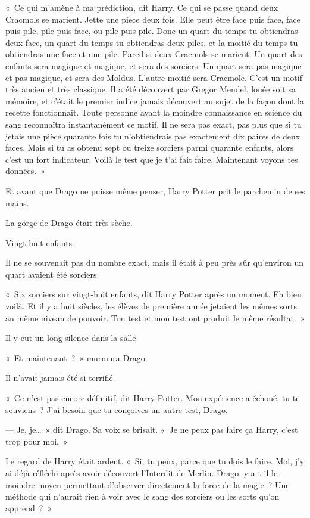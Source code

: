 «~Ce qui m'amène à ma prédiction, dit Harry.
Ce qui se passe quand deux Cracmols se marient.
Jette une pièce deux fois.
Elle peut être face puis face, face puis pile, pile puis face, ou pile puis pile.
Donc un quart du temps tu obtiendras deux face, un quart du temps tu obtiendras deux piles, et la moitié du temps tu obtiendras une face et une pile.
Pareil si deux Cracmols se marient.
Un quart des enfants sera magique et magique, et sera des sorciers.
Un quart sera pas-magique et pas-magique, et sera des Moldus.
L'autre moitié sera Cracmole.
C'est un motif très ancien et très classique.
Il a été découvert par Gregor Mendel, louée soit sa mémoire, et c'était le premier indice jamais découvert au sujet de la façon dont la recette fonctionnait.
Toute personne ayant la moindre connaissance en science du sang reconnaîtra instantanément ce motif.
Il ne sera pas exact, pas plus que si tu jetais une pièce quarante fois tu n'obtiendrais pas exactement dix paires de deux faces.
Mais si tu as obtenu sept ou treize sorciers parmi quarante enfants, alors c'est un fort indicateur.
Voilà le test que je t'ai fait faire.
Maintenant voyons tes données.~»

Et avant que Drago ne puisse même penser, Harry Potter prit le parchemin de ses mains.

La gorge de Drago était très sèche.

Vingt-huit enfants.

Il ne se souvenait pas du nombre exact, mais il était à peu près sûr qu'environ un quart avaient été sorciers.

«~Six sorciers sur vingt-huit enfants, dit Harry Potter après un moment.
Eh bien voilà.
Et il y a huit siècles, les élèves de première année jetaient les mêmes sorts au même niveau de pouvoir.
Ton test et mon test ont produit le même résultat.~»

Il y eut un long silence dans la salle.

«~Et maintenant~?~»
murmura Drago.

Il n'avait jamais été si terrifié.

«~Ce n'est pas encore définitif, dit Harry Potter.
Mon expérience a échoué, tu te souviens~?
J'ai besoin que tu conçoives un autre test, Drago.

--- Je, je…~»
dit Drago.
Sa voix se brisait.
«~Je ne peux pas faire ça Harry, c'est trop pour moi.~»

Le regard de Harry était ardent.
«~Si, tu peux, parce que tu dois le faire.
Moi, j'y ai déjà réfléchi après avoir découvert l'Interdit de Merlin.
Drago, y a-t-il le moindre moyen permettant d'observer directement la force de la magie~?
Une méthode qui n'aurait rien à voir avec le sang des sorciers ou les sorts qu'on apprend~?~»

